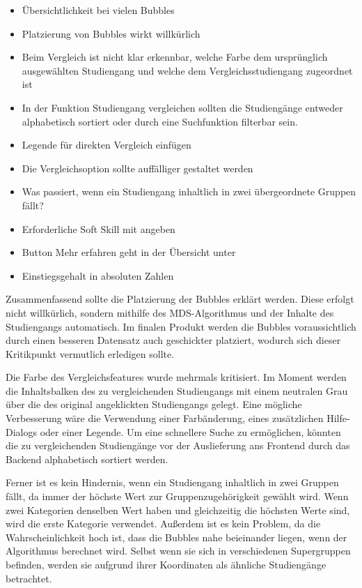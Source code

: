 \begin{itemize}
    \item Übersichtlichkeit bei vielen Bubbles
    \item Platzierung von Bubbles wirkt willkürlich
    \item Beim Vergleich ist nicht klar erkennbar, welche Farbe dem ursprünglich ausgewählten Studiengang und welche dem Vergleichsstudiengang zugeordnet ist
    \item In der Funktion \glqq Studiengang vergleichen\grqq{} sollten die Studiengänge entweder alphabetisch sortiert oder durch eine Suchfunktion filterbar sein.
    \item Legende für direkten Vergleich einfügen
    \item Die Vergleichsoption sollte auffälliger gestaltet werden
    \item Was passiert, wenn ein Studiengang inhaltlich in zwei übergeordnete Gruppen fällt?
    \item Erforderliche Soft Skill mit angeben
    \item Button \glqq Mehr erfahren\grqq{} geht in der Übersicht unter
    \item Einstiegsgehalt in absoluten Zahlen
\end{itemize}

Zusammenfassend sollte die Platzierung der Bubbles erklärt werden. Diese erfolgt nicht willkürlich, sondern mithilfe des MDS-Algorithmus und der Inhalte des Studiengangs automatisch. Im finalen Produkt werden die Bubbles voraussichtlich durch einen besseren Datensatz auch geschickter platziert, wodurch sich dieser Kritikpunkt vermutlich erledigen sollte.

Die Farbe des Vergleichsfeatures wurde mehrmals kritisiert. Im Moment werden die Inhaltsbalken des zu vergleichenden Studiengangs mit einem neutralen Grau über die des original angeklickten Studiengangs gelegt. Eine mögliche Verbesserung wäre die Verwendung einer Farbänderung, eines zusätzlichen Hilfe-Dialogs oder einer Legende. Um eine schnellere Suche zu ermöglichen, könnten die zu vergleichenden Studiengänge vor der Auslieferung ans Frontend durch das Backend alphabetisch sortiert werden.

Ferner ist es kein Hindernis, wenn ein Studiengang inhaltlich in zwei Gruppen fällt, da immer der höchste Wert zur Gruppenzugehörigkeit gewählt wird. Wenn zwei Kategorien denselben Wert haben und gleichzeitig die höchsten Werte sind, wird die erste Kategorie verwendet. Außerdem ist es kein Problem, da die Wahrscheinlichkeit hoch ist, dass die Bubbles nahe beieinander liegen, wenn der Algorithmus berechnet wird. Selbst wenn sie sich in verschiedenen Supergruppen befinden, werden sie aufgrund ihrer Koordinaten als ähnliche Studiengänge betrachtet.

